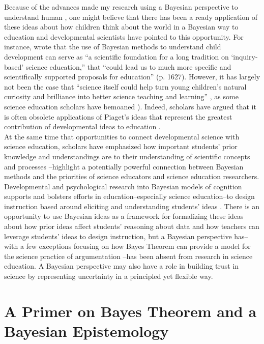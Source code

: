 \documentclass[man]{apa7}
\begin{document}
Because of the advances made my research using a Bayesian perspective to understand human  \parencite{gt07, gw12}, one might believe that there has been a ready application of these ideas about how children think about the world in a Bayesian way to education and developmental scientists have pointed to this opportunity. For instance, \textcite{g12} wrote that the use of Bayesian methods to understand child development can serve as “a scientific foundation for a long tradition on ‘inquiry-based’ science education,” that “could lead us to much more specific and scientifically supported proposals for education” (p. 1627). However, it has largely not been the case that “science itself could help turn young children’s natural curiosity and brilliance into better science teaching and learning” \textcite[p. 1627]{g12}, as some science education scholars have bemoaned \parencite{ls15}). Indeed, scholars have argued that it is often obsolete applications of Piaget’s ideas \parencite[e.g., ][]{pi69} that represent the greatest contribution of developmental ideas to education \textcite{ls07}. \\

At the same time that opportunities to connect developmental science with science education, scholars have emphasized how important students' prior knowledge and understandings are to their understanding of scientific concepts and processes \parencite[e.g., ][]{ssc07, mkm07, mkk17, ls04}--highlight a potentially powerful connection between Bayesian methods and the priorities of science educators and science education researchers. Developmental and psychological research into Bayesian models of cognition supports and bolsters efforts in education--especially science education--to design instruction based around eliciting and understanding students’ ideas \parencite{gb16, hbavb20, wtbs12}. There is an opportunity to use Bayesian ideas as a framework for formalizing these ideas about how prior ideas affect students’ reasoning about data and how teachers can leverage students’ ideas to design instruction, but a Bayesian perspective has--with a few exceptions focusing on how Bayes Theorem can provide a model for the science practice of argumentation \parencite[e.g., ][]{n11, so12}--has been absent from research in science education. A Bayesian perspective may also have a role in building trust in science by representing uncertainty in a principled yet flexible way. \\

\section{A Primer on Bayes Theorem and a Bayesian Epistemology}
\end{document}
